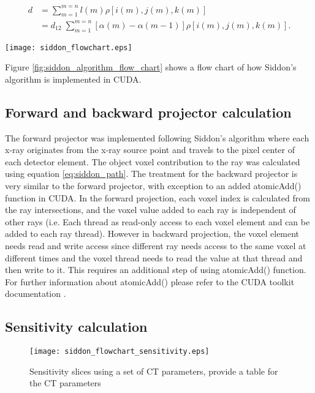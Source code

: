 \begin{equation}
\begin{aligned}
d &= \sum\limits_{m = 1}^{m = n} l(m) \rho\left[ i(m), j(m), k(m) \right] \\
  &= d_{12} \; \sum\limits_{m = 1}^{m = n} \left[ \alpha(m) - \alpha(m-1) \right] \rho \left[ i(m), j(m), k(m) \right].
\end{aligned}
\label{eq:siddon_path}
\end{equation}

\begin{sidewaysfigure}
\texttt{[image: siddon\_flowchart.eps]}
\caption{A flow chart of Siddon's algorithm implementation on CUDA}
\label{fig:siddon_algorithm_flow_chart}
\end{sidewaysfigure}

Figure \ref{fig:siddon_algorithm_flow_chart} shows a flow chart of how Siddon's algorithm is implemented in CUDA.

\subsection{Forward and backward projector calculation}
The forward projector was implemented following Siddon's algorithm where each x-ray originates from the x-ray source point and travels to the pixel center of each detector element.  The object voxel contribution to the ray was calculated using equation \ref{eq:siddon_path}.  The treatment for the backward projector is very similar to the forward projector, with exception to an added atomicAdd() function in CUDA.  In the forward projection, each voxel index is calculated from the ray intersections, and the voxel value added to each ray is independent of other rays (i.e. Each thread as read-only access to each voxel element and can be added to each ray thread).  However in backward projection, the voxel element needs read and write access since different ray needs access to the same voxel at different times and the voxel thread needs to read the value at that thread and then write to it.  This requires an additional step of using atomicAdd() function.  For further information about atomicAdd() please refer to the CUDA toolkit documentation \cite{Cudatoolkit}.  

\subsection{Sensitivity calculation}

\begin{figure}
\centering
\texttt{[image: siddon\_flowchart\_sensitivity.eps]}
\label{fig:sensitivityslices}
\caption{Sensitivity slices using a set of CT parameters, provide a table for the CT parameters}
\end{figure}

